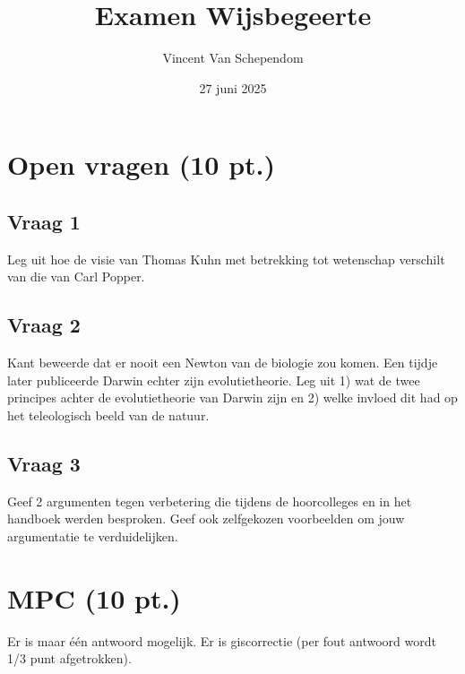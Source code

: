 \documentclass[kulak]{kulakarticle}
\title{Examen Wijsbegeerte}
\author{Vincent Van Schependom}
\date{27 juni 2025}
\begin{document}
	\maketitle

	\section*{Open vragen (10 pt.)}

	\subsection*{Vraag 1}

	Leg uit hoe de visie van Thomas Kuhn met betrekking tot wetenschap verschilt van die van Carl Popper.

	\subsection*{Vraag 2}

	Kant beweerde dat er nooit een Newton van de biologie zou komen. Een tijdje later publiceerde Darwin echter zijn evolutietheorie.
 	Leg uit 1) wat de twee principes achter de evolutietheorie van Darwin zijn en 2) welke invloed dit had op het teleologisch beeld van de natuur.

	\subsection*{Vraag 3}

	Geef 2 argumenten tegen verbetering die tijdens de hoorcolleges en in het handboek werden besproken. Geef ook zelfgekozen voorbeelden om jouw argumentatie te verduidelijken.

	\section*{MPC (10 pt.)}

	Er is maar één antwoord mogelijk. Er is giscorrectie (per fout antwoord wordt 1/3 punt afgetrokken).
\end{document}
